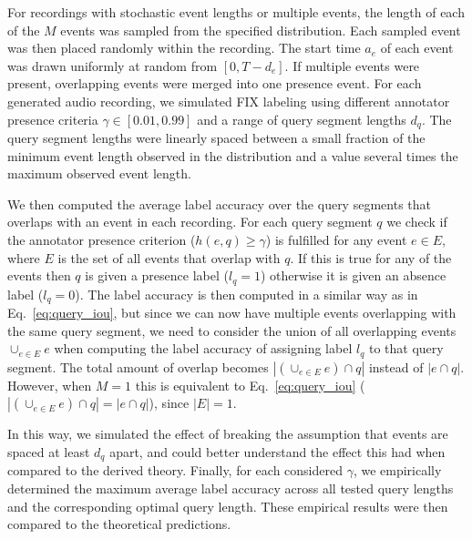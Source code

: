 For recordings with stochastic event lengths or multiple events, the length of each of the $M$ events was sampled from the specified distribution. Each sampled event was then placed randomly within the recording. The start time $a_e$ of each event was drawn uniformly at random from $[0, T - d_e]$. If multiple events were present, overlapping events were merged into one presence event. For each generated audio recording, we simulated FIX labeling using different annotator presence criteria $\gamma \in [0.01, 0.99]$ and a range of query segment lengths $d_q$. The query segment lengths were linearly spaced between a small fraction of the minimum event length observed in the distribution and a value several times the maximum observed event length. 

We then computed the average label accuracy over the query segments that overlaps with an event in each recording. For each query segment $q$ we check if the annotator presence criterion ($h(e, q) \geq \gamma$) is fulfilled for any event $e \in E$, where $E$ is the set of all events that overlap with $q$. If this is true for any of the events then $q$ is given a presence label ($l_q = 1$) otherwise it is given an absence label ($l_q = 0$). The label accuracy is then computed in a similar way as in Eq.~\ref{eq:query_iou}, but since we can now have multiple events overlapping with the same query segment, we need to consider the union of all overlapping events $\cup_{e\in E}e$ when computing the label accuracy of assigning label $l_q$ to that query segment. The total amount of overlap becomes $|(\cup_{e\in E} e) \cap q|$ instead of $|e \cap q|$. However, when $M=1$ this is equivalent to Eq.~\ref{eq:query_iou} ($|(\cup_{e\in E} e) \cap q| = |e \cap q|$), since $|E| = 1$.


In this way, we simulated the effect of breaking the assumption that events are spaced at least $d_q$ apart, and could better understand the effect this had when compared to the derived theory. Finally, for each considered $\gamma$, we empirically determined the maximum average label accuracy across all tested query lengths and the corresponding optimal query length. These empirical results were then compared to the theoretical predictions.

